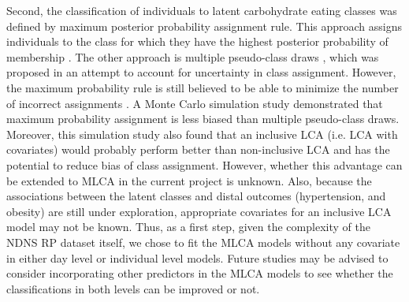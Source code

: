 Second, the classification of individuals to latent carbohydrate eating classes was defined by maximum posterior probability assignment rule. This approach assigns individuals to the class for which they have the highest posterior probability of membership \parencite{nagin2005group}. The other approach is multiple pseudo-class draws \parencite{wang2005residual}, which was proposed in an attempt to account for uncertainty in class assignment. However, the maximum probability rule is still believed to be able to minimize the number of incorrect assignments \parencite{goodman20071}. A Monte Carlo simulation study \parencite{bray2015eliminating} demonstrated that maximum probability assignment is less biased than multiple pseudo-class draws. Moreover, this simulation study also found that an inclusive LCA (i.e. LCA with covariates) would probably perform better than non-inclusive LCA and has the potential to reduce bias of class assignment. However, whether this advantage can be extended to MLCA in the current project is unknown. Also, because the associations between the latent classes and distal outcomes (hypertension, and obesity) are still under exploration, appropriate covariates for an inclusive LCA model may not be known. Thus, as a first step, given the complexity of the NDNS RP dataset itself, we chose to fit the MLCA models without any covariate in either day level or individual level models. Future studies may be advised to consider incorporating other predictors in the MLCA models to see whether the classifications in both levels can be improved or not. 

